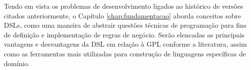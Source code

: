 



\newpage
Tendo em vista os problemas de desenvolvimento ligados ao histórico de versões citados anteriormente, o Capítulo \ref{chap:fundamentacao} aborda conceitos sobre \gls{DSL}s, como uma maneira de abstrair questões técnicas de programação para fins de definição e implementação de regras de negócio. Serão elencadas as principais vantagens e desvantagens da \gls{DSL} em relação à \gls{GPL} conforme a literatura, assim como as ferramentas mais utilizadas para construção de linguagens específicas de domínio.



